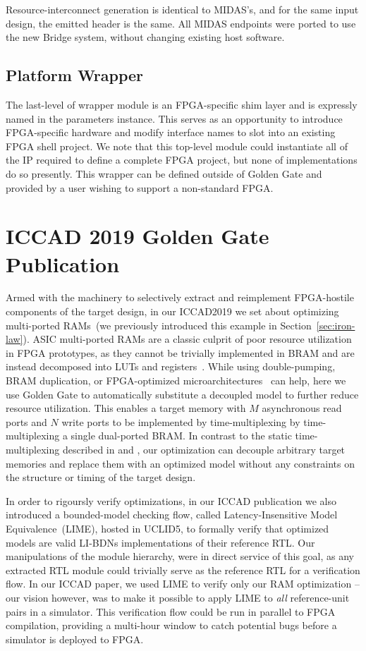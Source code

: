 Resource-interconnect generation is identical to MIDAS's, and for the same
input design, the emitted header is the same. All MIDAS endpoints were ported
to use the new Bridge system, without changing existing host software.

\subsection{Platform Wrapper}
The last-level of wrapper module is an FPGA-specific shim layer and is
expressly named in the parameters instance. This serves as an opportunity to
introduce FPGA-specific hardware and modify interface names to slot into an
existing FPGA shell project. We note that this top-level module could
instantiate all of the IP required to define a complete FPGA project, but none
of implementations do so presently. This wrapper can be defined outside of Golden Gate and 
provided by a user wishing to support a non-standard FPGA.

\section{ICCAD 2019 Golden Gate Publication}

Armed with the machinery to selectively extract and reimplement FPGA-hostile
components of the target design, in our ICCAD2019 we set about optimizing
multi-ported RAMs~(we previously introduced this example in
Section~\ref{sec:iron-law}).  ASIC multi-ported RAMs are a classic culprit of
poor resource utilization in FPGA prototypes, as they cannot be trivially
implemented in BRAM and are instead decomposed into LUTs and
registers~\cite{FPGAGap2}.  While using double-pumping, BRAM duplication, or
FPGA-optimized microarchitectures~\cite{MultiportXOR} can help, here we use Golden Gate to
automatically substitute a decoupled model to further reduce resource
utilization. This enables a target memory with $M$ asynchronous read ports and
$N$ write ports to be implemented by time-multiplexing by time-multiplexing
a single dual-ported BRAM. In contrast to the static time-multiplexing described
in \cite{APortNetworks} and \cite{fabscalarfpga}, our optimization can decouple arbitrary target
memories and replace them with an optimized model without any constraints on the structure or timing of the
target design.

In order to rigoursly verify optimizations, in our ICCAD publication we also
introduced a bounded-model checking flow, called Latency-Insensitive Model
Equivalence~(LIME), hosted in UCLID5, to formally verify that optimized models
are valid LI-BDNs implementations of their reference RTL.  Our manipulations of
the module hierarchy, were in direct service of this goal, as any extracted RTL
module could trivially serve as the reference RTL for a verification flow. In
our ICCAD paper, we used LIME to verify only our RAM optimization -- our vision
however, was to make it possible to apply LIME to \emph{all} reference-unit
pairs in a simulator. This verification flow could be run in parallel to FPGA
compilation, providing a multi-hour window to catch potential bugs before a
simulator is deployed to FPGA.

